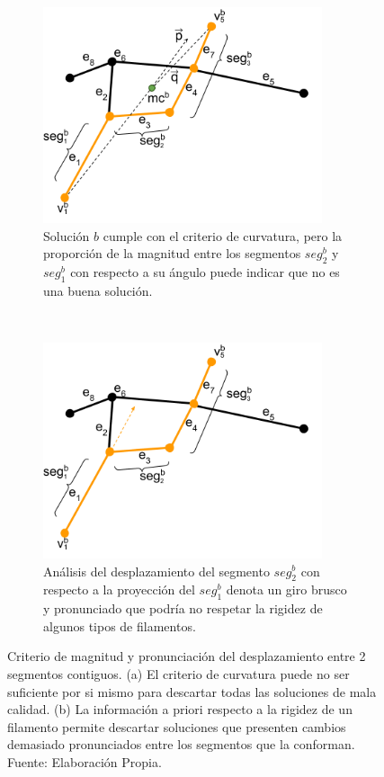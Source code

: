 \begin{figure}[h]
    \centering
    \begin{subfigure}[t]{0.45\textwidth}
        \centering
        \includegraphics[height=2.5in]{imagenes/ant_segmentMagnitude_case.png}
        \caption{Soluci\'on $b$ cumple con el criterio de curvatura, pero la proporci\'on de la magnitud entre los segmentos $seg^{b}_2$ y $seg^{b}_1$ con respecto a su \'angulo puede indicar que no es una buena soluci\'on.}
        \label{fig:antCurvNotEnough}
    \end{subfigure}
    ~ \hspace{0.5cm}
    \begin{subfigure}[t]{0.45\textwidth}
        \centering
        \includegraphics[height=2.5in]{imagenes/ant_segmentMagnitude_case_2.png}
        \caption{An\'alisis del desplazamiento del segmento $seg^{b}_2$ con respecto a la proyecci\'on del $seg^{b}_1$ denota un giro brusco y pronunciado que podr\'ia no respetar la rigidez de algunos tipos de filamentos.}
        \label{fig:antMaxDisplExample}
    \end{subfigure}%
    \caption{Criterio de magnitud y pronunciaci\'on del desplazamiento entre 2 segmentos contiguos. (a) El criterio de curvatura puede no ser suficiente por si mismo para descartar todas las soluciones de mala calidad. (b) La informaci\'on a priori respecto a la rigidez de un filamento permite descartar soluciones que presenten cambios demasiado pronunciados entre los segmentos que la conforman. Fuente: Elaboraci\'on Propia.}
    \label{fig:antMaxDisp}
\end{figure}

